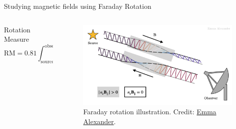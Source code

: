 \documentclass[xetex,aspectratio=169]{beamer}
\begin{document}
    \begin{frame}{Studying magnetic fields using Faraday Rotation}
    \footnotesize
    \begin{columns}
		
		\begin{column}{0.55\textwidth}
			
			
			
			\begin{block}{Rotation Measure}
				\begin{equation*}
					\text{RM} = 0.81 \int_{\text{source}}^{\text{observer}} n_e(r) B_{||}(r) \cdot dr\; \text{rad}\;\text{m}^{-2}
				\end{equation*}
			\end{block}

		\end{column}

		\begin{column}{0.45\textwidth}
			\begin{figure}
			    \centering
			    \includegraphics[width=\textwidth]{figures/faraday_rot.png}
			    \caption*{Faraday rotation illustration. Credit: \href{https://emmaalexander.github.io/resources.html}{Emma Alexander}.}
			\end{figure}
		\end{column}
	\end{columns}

    \end{frame}
    
\end{document}
